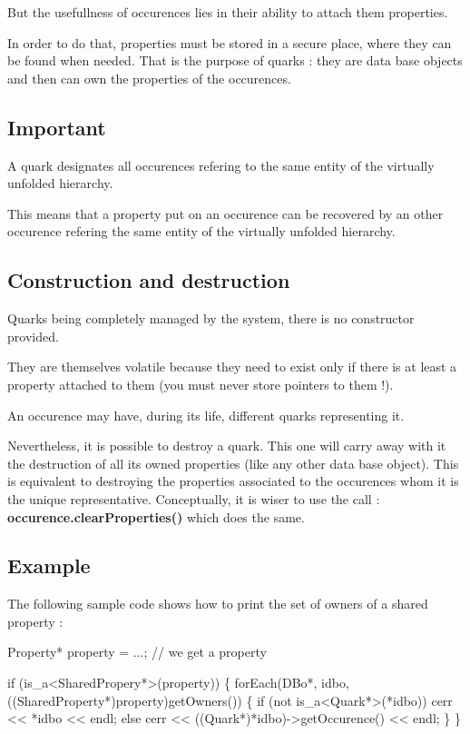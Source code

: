 But the usefullness of occurences lies in their ability to attach them properties.

In order to do that, properties must be stored in a secure place, where they can be found when needed. That is the purpose of quarks \-: they are data base objects and then can own the properties of the occurences.\hypertarget{classHurricane_1_1Quark_secQuarkImportant}{}\subsection{Important}\label{classHurricane_1_1Quark_secQuarkImportant}
A quark designates all occurences refering to the same entity of the virtually unfolded hierarchy.

This means that a property put on an occurence can be recovered by an other occurence refering the same entity of the virtually unfolded hierarchy.\hypertarget{classHurricane_1_1Quark_secQuarkConstructionAndDestruction}{}\subsection{Construction and destruction}\label{classHurricane_1_1Quark_secQuarkConstructionAndDestruction}
Quarks being completely managed by the system, there is no constructor provided.

They are themselves volatile because they need to exist only if there is at least a property attached to them (you must never store pointers to them !).

An occurence may have, during its life, different quarks representing it.

Nevertheless, it is possible to destroy a quark. This one will carry away with it the destruction of all its owned properties (like any other data base object). This is equivalent to destroying the properties associated to the occurences whom it is the unique representative. Conceptually, it is wiser to use the call \-: {\bfseries occurence.\-clear\-Properties()} which does the same.\hypertarget{classHurricane_1_1Quark_secQuarkExample}{}\subsection{Example}\label{classHurricane_1_1Quark_secQuarkExample}
The following sample code shows how to print the set of owners of a shared property \-: 
\begin{DoxyCode}
Property* \textcolor{keyword}{property} = ...; \textcolor{comment}{// we get a property}
 
\textcolor{keywordflow}{if} (is\_a<SharedPropery*>(property)) \{
  forEach(DBo*, idbo, ((SharedProperty*)property)getOwners()) \{
    \textcolor{keywordflow}{if} (not is\_a<Quark*>(*idbo))
      cerr << *idbo << endl;
    \textcolor{keywordflow}{else}
      cerr << ((Quark*)*idbo)->getOccurence() << endl;
  \}
\}
\end{DoxyCode}
 

